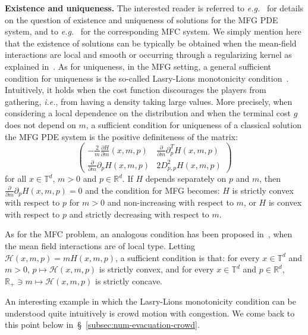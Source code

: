 \documentclass{amsproc}
\theoremstyle{definition}
\theoremstyle{remark}
\numberwithin{equation}{section}
\newcommand{\RR}{{\mathbb R}}
\newcommand{\TT}{{\mathbb T}}
\begin{document}
\textbf{Existence and uniqueness. } The interested reader is referred to \textit{e.g.}~\cite{PLL-CDF,MR2295621,Cardaliaguet-2013-notes} for details on the question of existence and uniqueness of solutions for the MFG PDE system, and to \textit{e.g.}~\cite{MR3392611,MR3498932} for the corresponding MFC system. We simply mention here that the existence of solutions can be typically be obtained when the mean-field interactions are local and smooth or occurring through a regularizing kernel as explained in~\cite{MR2295621}.  As for uniqueness, in the MFG setting, a general sufficient condition for uniqueness is the so-called Lasry-Lions monotonicity condition~\cite{MR2295621}. Intuitively, it holds when the cost function discourages the players from gathering, \textit{i.e.}, from having a density taking large values. More precisely, when considering a local dependence on the distribution and when the terminal cost $g$ does not depend on $m$, a sufficient condition for uniqueness of a classical solution the MFG PDE system is the positive definiteness of the matrix:
$$
  \begin{pmatrix}
 - \frac{2}{m} \frac {\partial H} {\partial m}    \left(x, m, p\right) &   \frac {\partial } {\partial m}  \partial_p ^T H(x, m, p)
\\
 \frac {\partial } {\partial m}  \partial_p H(x, m, p) & 2D^2_{p,p} H(x, m, p)
 \end{pmatrix}
$$
for all $x\in \TT^d$, $m>0$ and $p\in \RR^d$.  If $H$ depends separately on $p$ and $m$, then $\frac {\partial } {\partial m}  \partial_p H (x, m, p)=0$ and the condition for MFG becomes: $H$ is strictly convex with respect to $p$ for $m>0$ and non-increasing with respect to $m$, or $H$ is convex with respect to $p$ and strictly decreasing with respect to $m$.

As for the MFC problem, an analogous condition has been proposed in~\cite{MR3392611}, when the mean field interactions are of local type. Letting $\mathcal{H}(x, m, p) = m H(x, m, p)$, a sufficient condition is that: for every $x \in \TT^d$ and $m>0$, $p \mapsto \mathcal{H}(x, m, p)$ is strictly convex, and for every $x \in \TT^d$ and $p \in \RR^d$, $\RR_+  \ni m \mapsto \mathcal{H}(x, m, p)$ is strictly concave. 



	 
	 
	 
An interesting example in which the Lasry-Lions monotonicity condition can be understood quite intuitively is crowd motion with congestion. We come back to this point below in~\S~\ref{subsec:num-evacuation-crowd}.
 
\end{document}
